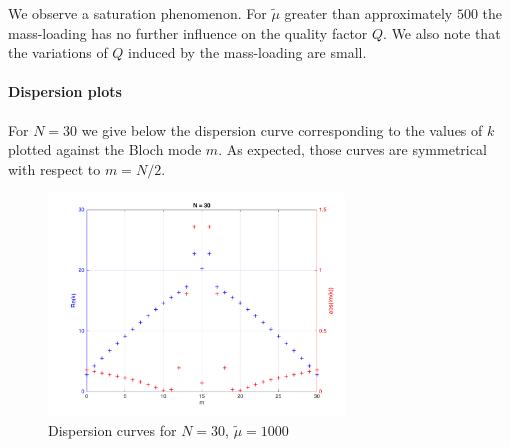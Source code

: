 \documentclass[11pt]{report}
\numberwithin{equation}{section}
\begin{document}
\noindent
We observe a saturation phenomenon. For $\tilde \mu$ greater than approximately $500$ the mass-loading has no further influence on the quality factor $Q$. We also note that the variations of $Q$ induced by the mass-loading are small.%

\paragraph{Dispersion plots} For $N=30$ we give below the dispersion curve corresponding to the values of $k$ plotted against the Bloch mode $m$. As expected, those curves are symmetrical with respect to $m=N/2$.

\begin{figure} [H]
    \centering
    \includegraphics[width = 0.7\textwidth]{m_symmetric}
    \caption{Dispersion curves for $N=30$, $\tilde \mu = 1000$}
    \label{fig:my_label}
\end{figure}

\listoffigures

\newpage

\printbibliography
\end{document}

